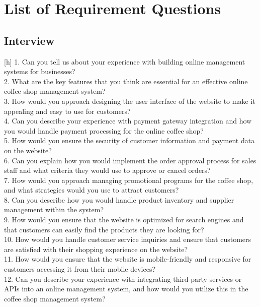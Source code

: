 
\appendix

\chapter{List of Requirement Questions}

\section{Interview}[h]
1. Can you tell us about your experience with building online management systems for businesses?		\\								
2. What are the key features that you think are essential for an effective online coffee shop management system?			\\							
3. How would you approach designing the user interface of the website to make it appealing and easy to use for customers?	\\									
4. Can you describe your experience with payment gateway integration and how you would handle payment processing for the online coffee shop?		\\			5. How would you ensure the security of customer information and payment data on the website?				\\						
6. Can you explain how you would implement the order approval process for sales staff and what criteria they would use to approve or cancel orders?\\			7. How would you approach managing promotional programs for the coffee shop, and what strategies would you use to attract customers?\\										
8. Can you describe how you would handle product inventory and supplier management within the system?		\\								
9. How would you ensure that the website is optimized for search engines and that customers can easily find the products they are looking for?	\\									
10. How would you handle customer service inquiries and ensure that customers are satisfied with their shopping experience on the website?	\\									
11. How would you ensure that the website is mobile-friendly and responsive for customers accessing it from their mobile devices?	\\									
12. Can you describe your experience with integrating third-party services or APIs into an online management system, and how would you utilize this in the coffee shop management system?			\\							
